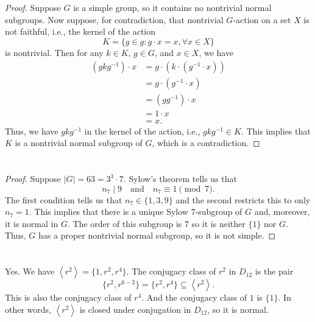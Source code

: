 \documentclass[12pt]{article}
\newcommand{\isp}[1]{\quad\text{#1}\quad}
\newcommand{\<}{\left\langle}
\renewcommand{\>}{\right\rangle}
\begin{document}
\section{}
\begin{proof}
    Suppose $G$ is a simple group, so it contains no nontrivial normal subgroups. Now suppose, for contradiction, that nontrivial $G$-action on a set $X$ is not faithful, i.e., the kernel of the action
    \[
        K = \{g \in g : g \cdot x = x, \forall x \in X\}
    \]
    is nontrivial. Then for any $k \in K$, $g \in G$, and $x \in X$, we have
    \begin{align*}
        (gkg^{-1}) \cdot x
            &= g \cdot(k \cdot(g^{-1} \cdot x)) \\
            &= g \cdot (g^{-1} \cdot x) \\
            &= (gg^{-1}) \cdot x \\
            &= 1 \cdot x \\
            &= x.
    \end{align*}
    Thus, we have $gkg^{-1}$ in the kernel of the action, i.e., $gkg^{-1} \in K$. This implies that $K$ is a nontrivial normal subgroup of $G$, which is a contradiction.
    
\end{proof}

\section{}
\begin{proof}
    Suppose $|G| = 63 = 3^3 \cdot 7$. Sylow's theorem tells us that
    \[
        n_7 \mid 9 \isp{and} n_7 \equiv 1 \pmod{7}.
    \]
    The first condition tells us that $n_7 \in \{1, 3, 9\}$ and the second restricts this to only $n_7 = 1$. This implies that there is a unique Sylow $7$-subgroup of $G$ and, moreover, it is normal in $G$. The order of this subgroup is $7$ so it is neither $\{1\}$ nor $G$. Thus, $G$ has a proper nontrivial normal subgroup, so it is not simple.
    
\end{proof}


\newpage
\section{}

\subsection{}
Yes. We have $\<r^2\> = \{1, r^2, r^4\}$. The conjugacy class of $r^2$ in $D_{12}$ is the pair
\[
    \{r^2, r^{6-2}\} = \{r^2, r^4\} \subseteq \<r^2\>.
\]
This is also the conjugacy class of $r^4$. And the conjugacy class of $1$ is $\{1\}$. In other words, $\<r^2\>$ is closed under conjugation in $D_{12}$, so it is normal.
\end{document}
